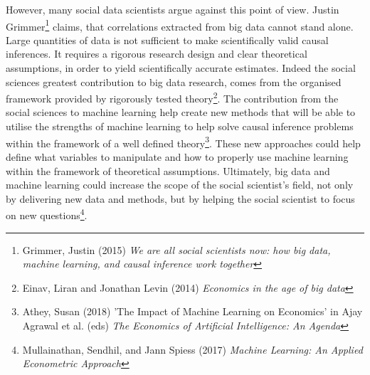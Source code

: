 \documentclass[12pt,a4paper]{article}
\begin{document}
However, many social data scientists argue against this point of view. Justin Grimmer\footnote{Grimmer, Justin (2015) \textit{We are all social scientists now: how big data, machine learning, and causal inference work together}} claims, that correlations extracted from big data cannot stand alone. Large quantities of data is not sufficient to make scientifically valid causal inferences. It requires a rigorous research design and clear theoretical assumptions, in order to yield scientifically accurate estimates. Indeed the social sciences greatest contribution to big data research, comes from the organised framework provided by rigorously tested theory\footnote{Einav, Liran and Jonathan Levin (2014) \textit{Economics in the age of big data}}.\newline
The contribution from the social sciences to machine learning help create new methods that will be able to utilise the strengths of machine learning to help solve causal inference problems within the framework of a well defined theory\footnote{Athey, Susan (2018) 'The Impact of Machine Learning on Economics' in Ajay Agrawal et al. (eds) \textit{The Economics of Artificial Intelligence: An Agenda}}. These new approaches could help define what variables to manipulate and how to properly use machine learning within the framework of theoretical assumptions. Ultimately, big data and machine learning could increase the scope of the social scientist's field, not only by delivering new data and methods, but by helping the social scientist to focus on new questions\footnote{Mullainathan, Sendhil, and Jann Spiess (2017) \textit{Machine Learning: An Applied Econometric Approach}}.
\end{document}
